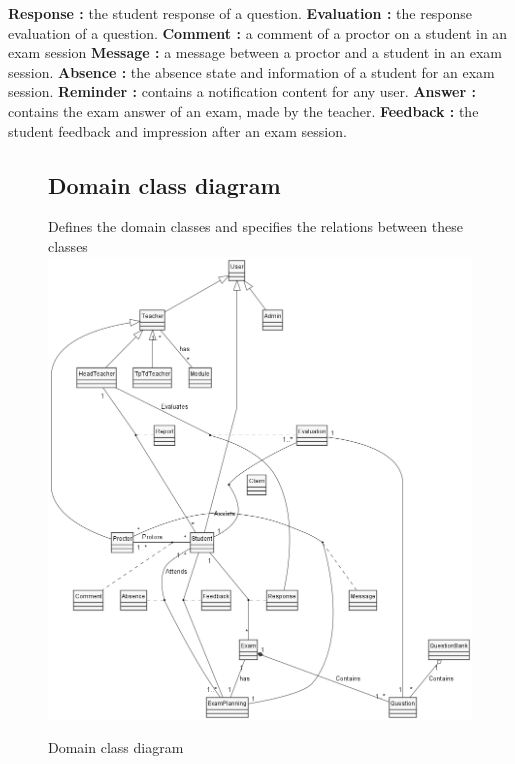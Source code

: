 \documentclass[]{uc2pfecaneva}
\begin{document}
    \textbf{Response :} the student response of a question.\linebreak
    \textbf{Evaluation :} the response evaluation of a question.\linebreak
    \textbf{Comment :} a comment of a proctor on a student in an exam session\linebreak
    \textbf{Message :} a message between a proctor and a student in an exam session.\linebreak
    \textbf{Absence :} the absence state and information of a student for an exam session.\linebreak
    \textbf{Reminder :} contains a notification content for any user.\linebreak
    \textbf{Answer :} contains the exam answer of an exam, made by the teacher.\linebreak
    \textbf{Feedback :} the student feedback and impression after an exam session.



    \begin{figure}
        \subsection{Domain class diagram}
        \raggedright Defines the domain classes and specifies the relations between these classes
        \linebreak
        \includegraphics[width=\textwidth]{images/DCD}
        \caption{Domain class diagram}
    \end{figure}
\end{document}
